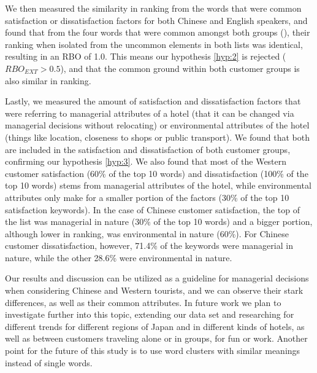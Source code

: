 We then measured the similarity in ranking from the words that were common satisfaction or dissatisfaction factors for both Chinese and English speakers, and found that from the four words that were common amongst both groups (\DIFdelbegin {}\DIFdelend \DIFaddbegin {}\DIFaddend ), their ranking when isolated from the uncommon elements in both lists was identical, resulting in an RBO of 1.0. This means our hypothesis \ref{hyp:2} is rejected (\(RBO_{EXT} > 0.5\)), and that the common ground within both customer groups is also similar in ranking.

Lastly, we measured the amount of satisfaction and dissatisfaction factors that were referring to managerial attributes of a hotel (that it can be changed via managerial decisions without relocating) or environmental attributes of the hotel (things like location, closeness to shops or public transport). We found that both are included in the satisfaction and dissatisfaction of both customer groups, confirming our hypothesis \ref{hyp:3}. We also found that most of the Western customer satisfaction (60\% of the top 10 words) and dissatisfaction (100\% of the top 10 words) stems from managerial attributes of the hotel, while environmental attributes only make for a smaller portion of the factors (30\% of the top 10 satisfaction keywords). In the case of Chinese customer satisfaction, the top of the list was managerial in nature (30\% of the top 10 words) and a bigger portion, although lower in ranking, was environmental in nature (60\%). For Chinese customer dissatisfaction, however, 71.4\% of the keywords were managerial in nature, while the other 28.6\% were environmental in nature.

Our results and discussion can be utilized as a guideline for managerial decisions when considering Chinese and Western tourists, and we can observe their stark differences, as well as their common attributes. In future work we plan to investigate further into this topic, extending our data set and researching for different trends for different regions of Japan and in different kinds of hotels, as well as between customers traveling alone or in groups, for fun or work. Another point \DIFaddbegin {}\DIFaddend for the future of this study is to use word clusters with similar meanings instead of single words. 


